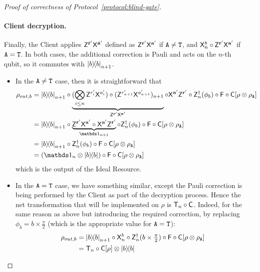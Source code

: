 \begin{proof}[Proof of correctness of Protocol~\ref{protocol:blind-gate}]
    \paragraph{Client decryption.}
    Finally, the Client applies $\mathsf{Z}^{\tilde{\mathbf r}'}\mathsf{X}^{\tilde{\mathbf a}'}$ defined as $\mathsf{Z}^{\mathbf r'}\mathsf{X}^{\mathbf a'}$ if $\mathtt{A}\neq \mathtt{T}$, and $\mathsf{X}^{b}_n\circ\mathsf{Z}^{\mathbf r'}\mathsf{X}^{\mathbf a'}$ if $\mathtt{A}=\mathtt{T}$. In both cases, the additional correction is Pauli and acts on the $n$-th qubit, so it commutes with $\ketbra b_{n+1}$.
    \begin{itemize}
        \item In the $\mathtt{A}\neq \mathtt{T}$ case, then it is straightforward that
        \begin{align}
            \rho_{out, b}
            &=
            \ketbra b_{n+1}
            \circ
            \underbrace{(\bigotimes_{i\leq n}\Dec{a'_i}{r'_i})
            \circ
            (\Dec{a'_{n+1}}{r'_{n+1}})_{n+1}}_{\Dec{\a'}{\r'}}
            \circ
            \Enc{\a'}{\r'}
            \circ
            \Z_n^\dagger(\phi_{b})
            \circ
            \F
            \circ
            \C
        [
            \rho\otimes \rho_\A
        ]
        \nonumber
        \\
        &=
            \ketbra b_{n+1}
            \circ
            \underbrace{\Dec{\a'}{\r'}
            \circ
            \Enc{\a'}{\r'}}_{\id_{n+1}}
            \circ
            \Z_n^\dagger(\phi_{b})
            \circ
            \F
            \circ
            \C
        [
            \rho\otimes \rho_\A
        ]
        \\
        &=
            \ketbra b_{n+1}
            \circ
            \Z_n^\dagger(\phi_{b})
            \circ
            \F
            \circ
            \C
        [
            \rho\otimes \rho_\A
        ]
        \\
        &=
            (\id_n\otimes \ketbra b)
            \circ
            \F
            \circ
            \C
        [
            \rho\otimes \rho_\A
        ]
    \end{align}
    which is the output of the Ideal Resource.
    \item In the $\mathtt{A}=\mathtt{T}$ case, we have something similar, except the Pauli correction is being performed by the Client as part of the decryption process. Hence the net transformation that will be implemented on $\rho$ is $\mathsf{T}_n\circ \mathsf{C}$. Indeed, for the same reason as above but introducing the required correction, by replacing $\phi_b=b\times\tfrac\pi2$ (which is the appropriate value for $\mathtt{A}=\mathtt{T}$):
        \begin{align}
            \rho_{out, b}
            &=
            \ketbra b_{n+1}
            \circ
            \mathsf{X}^{b}_{n}
            \circ
            \mathsf{Z}_n^\dagger({b}\times \tfrac{\pi}{2})
            \circ
            \mathsf{F}
            \circ
            \mathsf{C}
        [
            \rho\otimes \rho_{\mathtt{A}}
        ]
        \\
        &=
            \mathsf{T}_n\circ\mathsf{C}[\rho]
            \otimes
            \ketbra b
    \end{align}
    \end{itemize}


\end{proof}
